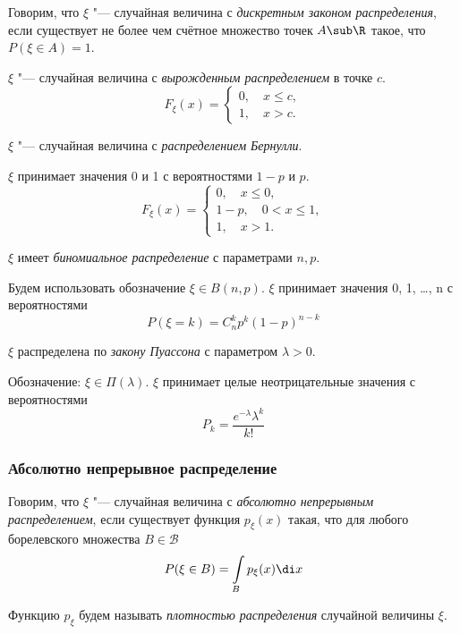 \begin{definition}
	Говорим, что $ \xi $ "--- случайная величина с \emph{дискретным законом распределения}, если
	существует не более чем счётное множество точек $ A \sub \R $ такое, что $ P(\xi \in A) = 1 $.
\end{definition}

\begin{exmpls}
\item $ \xi $ "--- случайная величина с \emph{вырожденным распределением} в точке $ c $.
	$$ F_\xi(x) =
	\begin{cases}
		0, \quad x \le c, \\
		1, \quad x > c.
	\end{cases} $$
\item $ \xi $ "--- случайная величина с \emph{распределением Бернулли}.

	$ \xi $ принимает значения 0 и 1 с вероятностями $ 1 - p $ и $ p $.
	$$ F_\xi(x) =
	\begin{cases}
		0, \quad x \le 0, \\
		1 - p, \quad 0 < x \le 1, \\
		1, \quad x > 1.
	\end{cases} $$
\item $ \xi $ имеет \emph{биномиальное распределение} с параметрами $ n, p $.

	Будем использовать обозначение $ \xi \in B(n, p) $.
	$ \xi $ принимает значения 0, 1, \dots, n с вероятностями
	$$ P(\xi = k) = C_n^k p^k (1 - p)^{n - k} $$
\item $ \xi $ распределена по \emph{закону Пуассона} с параметром $ \lambda > 0 $.

	Обозначение: $ \xi \in \Pi(\lambda) $.
	$ \xi $ принимает целые неотрицательные значения с вероятностями
	$$ P_k = \frac{e^{-\lambda}\lambda^k}{k!} $$
\end{exmpls}

\subsubsection{Абсолютно непрерывное распределение}

\begin{definition}
	Говорим, что $ \xi $ "--- случайная величина с \emph{абсолютно непрерывным распределением}, если
	существует функция $ p_\xi(x) $ такая, что для любого борелевского множества
	$ B \in \mathcal B $
	$$ P( \xi \in B) = \int\limits_B p_\xi(x) \di x $$

	Функцию $ p_\xi $ будем называть \emph{плотностью распределения} случайной величины $ \xi $.
\end{definition}

